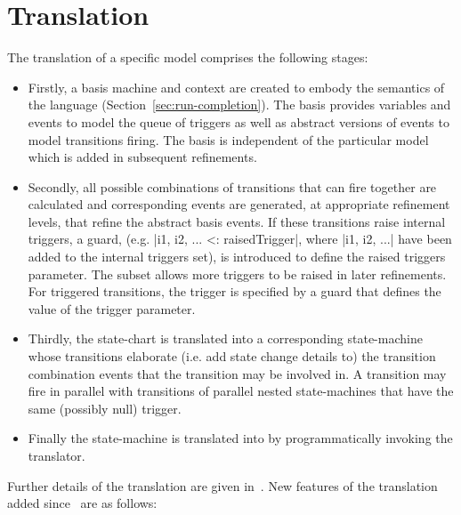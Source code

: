 
\section{\SCXML Translation}
\label{sec:translation}

The translation of a specific \SCXML model comprises the following stages: 
\begin{itemize}
	\item 
Firstly, a basis machine and context are created to embody the semantics of the \SCXML language (Section~\ref{sec:run-completion}).
The basis provides variables and events to model the queue of triggers as well as abstract versions of events to model transitions firing.
The basis is independent of the particular \SCXML model which is added in subsequent refinements.
	\item 
Secondly, all possible combinations of transitions that can fire together are calculated and corresponding events are generated, at appropriate refinement levels, that refine the abstract basis events.  
If these transitions raise internal triggers, a guard, (e.g. |{i1, i2, ...} <: raisedTrigger|, where |i1, i2, ...| have been added to the internal triggers set), is introduced to define the raised triggers parameter. 
The subset allows more triggers to be raised in later refinements.
For triggered transitions, the trigger is specified by a guard that defines the value of the trigger parameter. 
	\item 
Thirdly, the \SCXML state-chart is translated into a corresponding \UMLB state-machine whose transitions elaborate (i.e. add state change details to) the transition combination events that the transition may be involved in.
A transition may fire in parallel with transitions of parallel nested state-machines that have the same (possibly null) trigger.
	\item
Finally the \UMLB state-machine is translated into \EVENTB by programmatically invoking the \UMLB translator.
\end{itemize}
Further details of the translation are given in~\cite{MoSn16,MoSnHo18}.
New features of the translation added since~\cite{MoSnHo18} are as follows:
